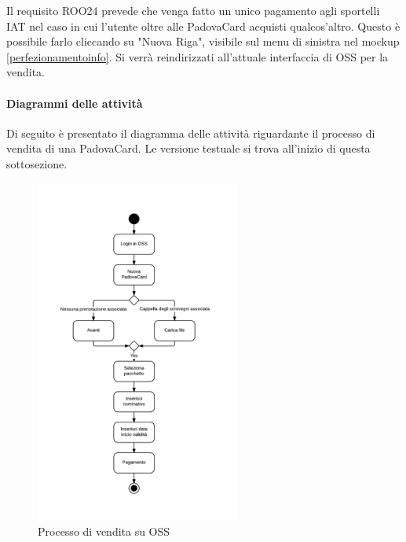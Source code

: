 Il requisito ROO24 prevede che venga fatto un unico pagamento agli sportelli IAT nel caso in cui l'utente oltre alle PadovaCard acquisti qualcos'altro. Questo è possibile farlo cliccando su "Nuova Riga", visibile sul menu di sinistra nel mockup \ref{perfezionamentoinfo}. Si verrà reindirizzati all'attuale interfaccia di OSS per la vendita.


\paragraph{Diagrammi delle attività}

Di seguito è presentato il diagramma delle attività riguardante il processo di vendita di una PadovaCard. Le versione testuale si trova all'inizio di questa sottosezione. \\
\begin{figure}[H]
\centering
\includegraphics[width=0.6\textwidth]{images/tdocumentos.png}
\caption{Processo di vendita su OSS}
\end{figure}

